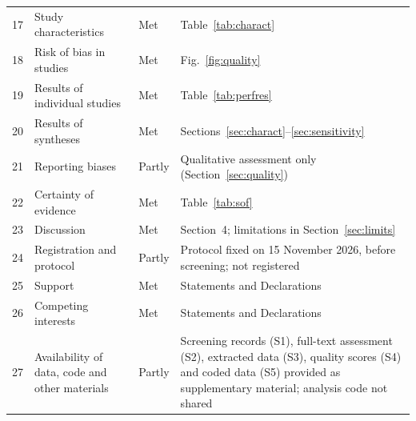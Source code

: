 \documentclass[preprint,12pt]{elsarticle}
\begin{document}
\begin{longtable}{@{}L{0.9cm}L{4.2cm}L{1.6cm}L{7.9cm}@{}}
17 & Study characteristics & Met & Table~\ref{tab:charact}\\
18 & Risk of bias in studies & Met & Fig.~\ref{fig:quality}\\
19 & Results of individual studies & Met & Table~\ref{tab:perfres}\\
20 & Results of syntheses & Met & Sections~\ref{sec:charact}--\ref{sec:sensitivity}\\
21 & Reporting biases & Partly & Qualitative assessment only (Section~\ref{sec:quality})\\
22 & Certainty of evidence & Met & Table~\ref{tab:sof}\\
23 & Discussion & Met & Section~4; limitations in Section~\ref{sec:limits}\\
24 & Registration and protocol & Partly & Protocol fixed on 15 November 2026, before screening; not registered\\
25 & Support & Met & Statements and Declarations\\
26 & Competing interests & Met & Statements and Declarations\\
27 & Availability of data, code and other materials & Partly & Screening records (S1), full-text assessment (S2), extracted data (S3), quality scores (S4) and coded data (S5) provided as supplementary material; analysis code not shared\\
\bottomrule\end{longtable}


\end{document}
